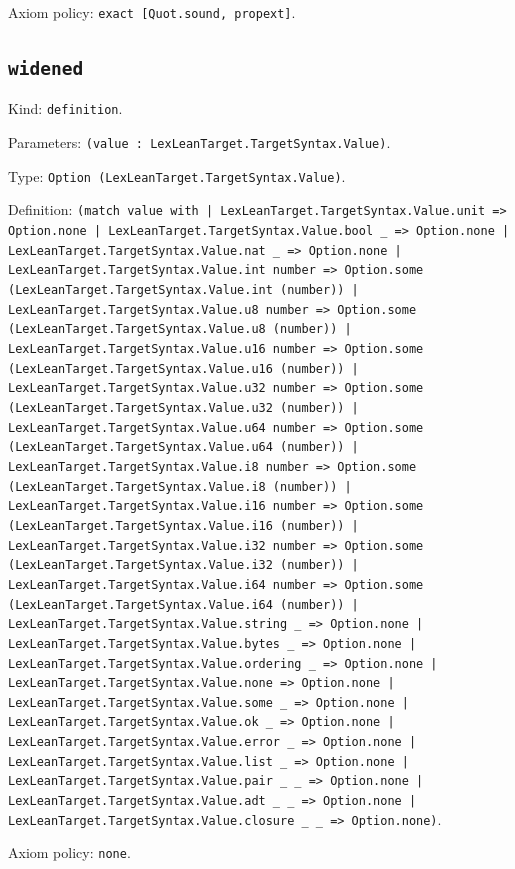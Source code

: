 \documentclass[11pt]{article}
\begin{document}
\noindent Axiom policy: \texttt{exact [Quot.sound, propext]}.\par
\subsection*{\texttt{widened}}
\noindent Kind: \texttt{definition}.\par
\noindent Parameters: \texttt{(value : LexLeanTarget.TargetSyntax.Value)}.\par
\noindent Type: \texttt{Option (LexLeanTarget.TargetSyntax.Value)}.\par
\noindent Definition: \texttt{(match value with | LexLeanTarget.TargetSyntax.Value.unit => Option.none | LexLeanTarget.TargetSyntax.Value.bool \_ => Option.none | LexLeanTarget.TargetSyntax.Value.nat \_ => Option.none | LexLeanTarget.TargetSyntax.Value.int number => Option.some (LexLeanTarget.TargetSyntax.Value.int (number)) | LexLeanTarget.TargetSyntax.Value.u8 number => Option.some (LexLeanTarget.TargetSyntax.Value.u8 (number)) | LexLeanTarget.TargetSyntax.Value.u16 number => Option.some (LexLeanTarget.TargetSyntax.Value.u16 (number)) | LexLeanTarget.TargetSyntax.Value.u32 number => Option.some (LexLeanTarget.TargetSyntax.Value.u32 (number)) | LexLeanTarget.TargetSyntax.Value.u64 number => Option.some (LexLeanTarget.TargetSyntax.Value.u64 (number)) | LexLeanTarget.TargetSyntax.Value.i8 number => Option.some (LexLeanTarget.TargetSyntax.Value.i8 (number)) | LexLeanTarget.TargetSyntax.Value.i16 number => Option.some (LexLeanTarget.TargetSyntax.Value.i16 (number)) | LexLeanTarget.TargetSyntax.Value.i32 number => Option.some (LexLeanTarget.TargetSyntax.Value.i32 (number)) | LexLeanTarget.TargetSyntax.Value.i64 number => Option.some (LexLeanTarget.TargetSyntax.Value.i64 (number)) | LexLeanTarget.TargetSyntax.Value.string \_ => Option.none | LexLeanTarget.TargetSyntax.Value.bytes \_ => Option.none | LexLeanTarget.TargetSyntax.Value.ordering \_ => Option.none | LexLeanTarget.TargetSyntax.Value.none => Option.none | LexLeanTarget.TargetSyntax.Value.some \_ => Option.none | LexLeanTarget.TargetSyntax.Value.ok \_ => Option.none | LexLeanTarget.TargetSyntax.Value.error \_ => Option.none | LexLeanTarget.TargetSyntax.Value.list \_ => Option.none | LexLeanTarget.TargetSyntax.Value.pair \_ \_ => Option.none | LexLeanTarget.TargetSyntax.Value.adt \_ \_ => Option.none | LexLeanTarget.TargetSyntax.Value.closure \_ \_ => Option.none)}.\par
\noindent Axiom policy: \texttt{none}.\par
\end{document}
